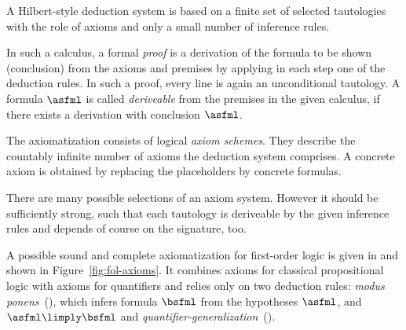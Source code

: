                 A Hilbert-style deduction system is based on a finite set of selected tautologies with the role of axioms and only a small number of inference rules.

                In such a calculus, a formal \emph{proof} is a derivation of the formula to be shown (conclusion) from the axioms and premises by applying in each step one of the deduction rules.
                In such a proof, every line is again an unconditional tautology.
                A formula $\asfml$ is called \emph{deriveable} from the premises in the given calculus, if there exists a derivation with conclusion $\asfml$.

                The axiomatization consists of logical \emph{axiom schemes}. They describe the countably infinite number of axioms the deduction system comprises. A concrete axiom is obtained by replacing the placeholders by concrete formulas.

                There are many possible selections of an axiom system. However it should be sufficiently strong, such that each tautology is deriveable by the given inference rules and depends of course on the signature, too.



                A possible sound and complete axiomatization for first-order logic is given in \cite{Bimbo14ProofTheory} and shown in Figure~\ref{fig:fol-axioms}.                
                It combines axioms for classical propositional logic with axioms for quantifiers and relies only on two deduction rules: \emph{modus ponens}~(), which infers formula $\bsfml$ from the hypotheses $\asfml$, and $\asfml\limply\bsfml$ and \emph{quantifier-generalization}~().
                


